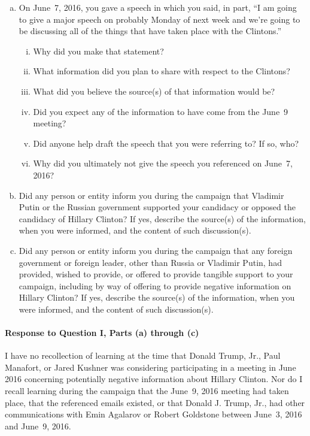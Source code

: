 \begin{enumerate}[a.]
\item On June~7, 2016, you gave a speech in which you said, in part, ``I am going to give a major speech on probably Monday of next week and we're going to be discussing all of the things that have taken place with the Clintons.''

\begin{enumerate}[i.]

\item Why did you make that statement?
\item What information did you plan to share with respect to the Clintons?
\item What did you believe the source(s) of that information would be?
\item Did you expect any of the information to have come from the June~9 meeting?
\item Did anyone help draft the speech that you were referring to? If so, who?
\item Why did you ultimately not give the speech you referenced on June~7, 2016?

\end{enumerate}

\item Did any person or entity inform you during the campaign that Vladimir Putin or the Russian government supported your candidacy or opposed the candidacy of Hillary Clinton?
If yes, describe the source(s) of the information, when you were informed, and the content of such discussion(s).

\item Did any person or entity inform you during the campaign that any foreign government or foreign leader, other than Russia or Vladimir Putin, had provided, wished to provide, or offered to provide tangible support to your campaign, including by way of offering to provide negative information on Hillary Clinton?
If yes, describe the source(s) of the information, when you were informed, and the content of such discussion(s).

\end{enumerate}

\paragraph*{Response to Question I, Parts (a) through (c)}

I have no recollection of learning at the time that Donald Trump, Jr., Paul Manafort, or Jared Kushner was considering participating in a meeting in June 2016 concerning potentially negative information about Hillary Clinton.
Nor do I recall learning during the campaign that the June~9, 2016 meeting had taken place, that the referenced emails existed, or that Donald J. Trump, Jr., had other communications with Emin Agalarov or Robert Goldstone between June~3, 2016 and June~9, 2016.


